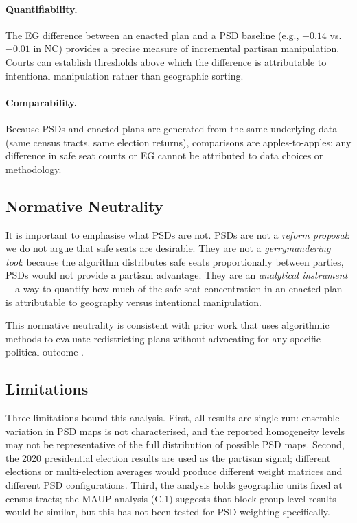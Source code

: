 \paragraph{Quantifiability.}
The EG difference between an enacted plan and a PSD baseline (e.g., $+0.14$
vs.\ $-0.01$ in NC) provides a precise measure of incremental partisan
manipulation.  Courts can establish thresholds above which the difference is
attributable to intentional manipulation rather than geographic sorting.

\paragraph{Comparability.}
Because PSDs and enacted plans are generated from the same underlying data
(same census tracts, same election returns), comparisons are apples-to-apples:
any difference in safe seat counts or EG cannot be attributed to data choices
or methodology.

\subsection{Normative Neutrality}

It is important to emphasise what PSDs are not.  PSDs are not a \emph{reform
proposal}: we do not argue that safe seats are desirable.  They are not a
\emph{gerrymandering tool}: because the algorithm distributes safe seats
proportionally between parties, PSDs would not provide a partisan advantage.
They are an \emph{analytical instrument}---a way to quantify how much of the
safe-seat concentration in an enacted plan is attributable to geography versus
intentional manipulation.

This normative neutrality is consistent with prior work that uses algorithmic
methods to evaluate redistricting plans without advocating for any specific
political outcome \citep{dellib2026edgeweighted, chen2013unintentional}.

\subsection{Limitations}

Three limitations bound this analysis.  First, all results are single-run:
ensemble variation in PSD maps is not characterised, and the reported
homogeneity levels may not be representative of the full distribution of
possible PSD maps.  Second, the 2020 presidential election results are used
as the partisan signal; different elections or multi-election averages would
produce different weight matrices and different PSD configurations.  Third,
the analysis holds geographic units fixed at census tracts; the MAUP
analysis (C.1) suggests that block-group-level results would be similar, but
this has not been tested for PSD weighting specifically.

